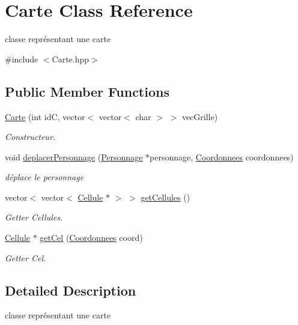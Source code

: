 \hypertarget{classCarte}{\section{Carte Class Reference}
\label{classCarte}
}


classe représentant une carte  




{\ttfamily \#include $<$Carte.\-hpp$>$}

\subsection*{Public Member Functions}
\begin{DoxyCompactItemize}
\item 
\hyperlink{classCarte_a7b0b6451f5eda0debb91f85eca7f7d07}{Carte} (int id\-C, vector$<$ vector$<$ char $>$ $>$ vec\-Grille)
\begin{DoxyCompactList}\small\item\em Constructeur. \end{DoxyCompactList}\item 
void \hyperlink{classCarte_a276dc4e72a6cd5d5a32ebb5f56378230}{deplacer\-Personnage} (\hyperlink{classPersonnage}{Personnage} $\ast$personnage, \hyperlink{classCoordonnees}{Coordonnees} coordonnees)
\begin{DoxyCompactList}\small\item\em déplace le personnage \end{DoxyCompactList}\item 
vector$<$ vector$<$ \hyperlink{classCellule}{Cellule} $\ast$ $>$ $>$ \hyperlink{classCarte_a4d02432842f01a1ea4027294e404793f}{get\-Cellules} ()
\begin{DoxyCompactList}\small\item\em Getter Cellules. \end{DoxyCompactList}\item 
\hyperlink{classCellule}{Cellule} $\ast$ \hyperlink{classCarte_ab3c15550ca7cf7153a7976b8c3d78fd9}{get\-Cel} (\hyperlink{classCoordonnees}{Coordonnees} coord)
\begin{DoxyCompactList}\small\item\em Getter Cel. \end{DoxyCompactList}\end{DoxyCompactItemize}


\subsection{Detailed Description}
classe représentant une carte 

